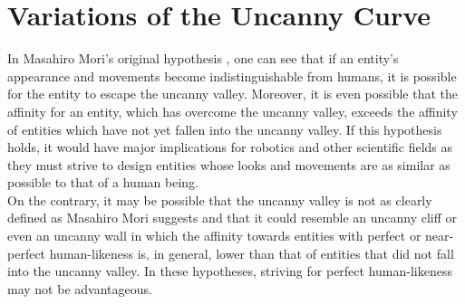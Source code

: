 \chapter{Variations of the Uncanny Curve}
\label{chap:3}
In Masahiro Mori’s original hypothesis \cite{original_masahiro}, one can see that if an entity's appearance and movements become indistinguishable from humans, it is possible for the entity to escape the uncanny valley. Moreover, it is even possible that the affinity for an entity, which has overcome the uncanny valley, exceeds the affinity of entities which have not yet fallen into the uncanny valley. If this hypothesis holds, it would have major implications for robotics and other scientific fields as they must strive to design entities whose looks and movements are as similar as possible to that of a human being.\\
On the contrary, it may be possible that the uncanny valley is not as clearly defined as Masahiro Mori suggests and that it could resemble an uncanny cliff or even an uncanny wall in which the affinity towards entities with perfect or near-perfect human-likeness is, in general, lower than that of entities that did not fall into the uncanny valley. In these hypotheses, striving for perfect human-likeness may not be advantageous.


